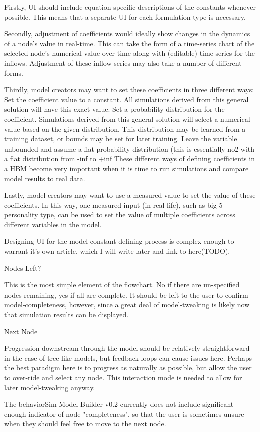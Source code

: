 Firstly, UI should include equation-specific descriptions of the constants whenever possible. This means that a separate UI for each formulation type is necessary. 

Secondly, adjustment of coefficients would ideally show changes in the dynamics of a node's value in real-time. This can take the form of a time-series chart of the selected node's numerical value over time along with (editable) time-series for the inflows. Adjustment of these inflow series may also take a number of different forms. 

Thirdly, model creators may want to set these coefficients in three different ways: 
Set the coefficient value to a constant. All simulations derived from this general solution will have this exact value.
Set a probability distribution for the coefficient. Simulations derived from this general solution will select a numerical value based on the given distribution. This distribution may be learned from a training dataset, or bounds may be set for later training. 
Leave the variable unbounded and assume a flat probability distribution (this is essentially no2 with a flat distribution from -inf to +inf
These different ways of defining coefficients in a HBM become very important when it is time to run simulations and compare model results to real data. 

Lastly, model creators may want to use a measured value to set the value of these coefficients. In this way, one measured input (in real life), such as big-5 personality type, can be used to set the value of multiple coefficients across different variables in the model.

Designing UI for the model-constant-defining process is complex enough to warrant it's own article, which I will write later and link to here(TODO).

Nodes Left?

This is the most simple element of the flowchart. No if there are un-specified nodes remaining, yes if all are complete. It should be left to the user to confirm model-completeness, however, since a great deal of model-tweaking is likely now that simulation results can be displayed.

Next Node

Progression downstream through the model should be relatively straightforward in the case of tree-like models, but feedback loops can cause issues here. Perhaps the best paradigm here is to progress as naturally as possible, but allow the user to over-ride and select any node. This interaction mode is needed to allow for later model-tweaking anyway. 

The behaviorSim Model Builder v0.2 currently does not include significant enough indicator of node "completeness", so that the user is sometimes unsure when they should feel free to move to the next node.
